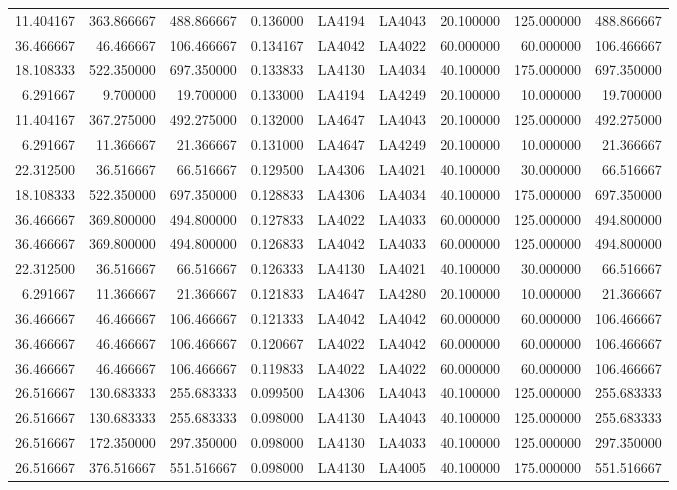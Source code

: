 \begin{tabular}{rrrrllrrr}
11.404167 & 363.866667 & 488.866667 & 0.136000 & LA4194 & LA4043 & 20.100000 & 125.000000 & 488.866667 \\
36.466667 & 46.466667 & 106.466667 & 0.134167 & LA4042 & LA4022 & 60.000000 & 60.000000 & 106.466667 \\
18.108333 & 522.350000 & 697.350000 & 0.133833 & LA4130 & LA4034 & 40.100000 & 175.000000 & 697.350000 \\
6.291667 & 9.700000 & 19.700000 & 0.133000 & LA4194 & LA4249 & 20.100000 & 10.000000 & 19.700000 \\
11.404167 & 367.275000 & 492.275000 & 0.132000 & LA4647 & LA4043 & 20.100000 & 125.000000 & 492.275000 \\
6.291667 & 11.366667 & 21.366667 & 0.131000 & LA4647 & LA4249 & 20.100000 & 10.000000 & 21.366667 \\
22.312500 & 36.516667 & 66.516667 & 0.129500 & LA4306 & LA4021 & 40.100000 & 30.000000 & 66.516667 \\
18.108333 & 522.350000 & 697.350000 & 0.128833 & LA4306 & LA4034 & 40.100000 & 175.000000 & 697.350000 \\
36.466667 & 369.800000 & 494.800000 & 0.127833 & LA4022 & LA4033 & 60.000000 & 125.000000 & 494.800000 \\
36.466667 & 369.800000 & 494.800000 & 0.126833 & LA4042 & LA4033 & 60.000000 & 125.000000 & 494.800000 \\
22.312500 & 36.516667 & 66.516667 & 0.126333 & LA4130 & LA4021 & 40.100000 & 30.000000 & 66.516667 \\
6.291667 & 11.366667 & 21.366667 & 0.121833 & LA4647 & LA4280 & 20.100000 & 10.000000 & 21.366667 \\
36.466667 & 46.466667 & 106.466667 & 0.121333 & LA4042 & LA4042 & 60.000000 & 60.000000 & 106.466667 \\
36.466667 & 46.466667 & 106.466667 & 0.120667 & LA4022 & LA4042 & 60.000000 & 60.000000 & 106.466667 \\
36.466667 & 46.466667 & 106.466667 & 0.119833 & LA4022 & LA4022 & 60.000000 & 60.000000 & 106.466667 \\
26.516667 & 130.683333 & 255.683333 & 0.099500 & LA4306 & LA4043 & 40.100000 & 125.000000 & 255.683333 \\
26.516667 & 130.683333 & 255.683333 & 0.098000 & LA4130 & LA4043 & 40.100000 & 125.000000 & 255.683333 \\
26.516667 & 172.350000 & 297.350000 & 0.098000 & LA4130 & LA4033 & 40.100000 & 125.000000 & 297.350000 \\
26.516667 & 376.516667 & 551.516667 & 0.098000 & LA4130 & LA4005 & 40.100000 & 175.000000 & 551.516667 \\

\end{tabular}
